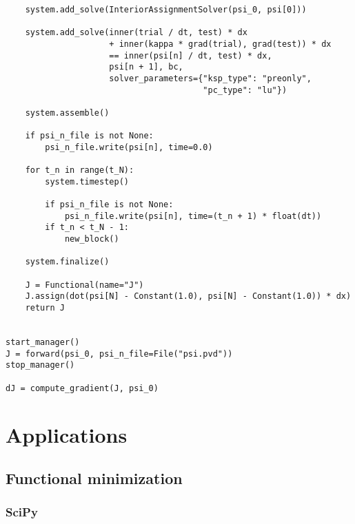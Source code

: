 \documentclass[11pt]{article}
\begin{document}
\begin{lstlisting}
    system.add_solve(InteriorAssignmentSolver(psi_0, psi[0]))

    system.add_solve(inner(trial / dt, test) * dx
                     + inner(kappa * grad(trial), grad(test)) * dx
                     == inner(psi[n] / dt, test) * dx,
                     psi[n + 1], bc,
                     solver_parameters={"ksp_type": "preonly",
                                        "pc_type": "lu"})

    system.assemble()

    if psi_n_file is not None:
        psi_n_file.write(psi[n], time=0.0)

    for t_n in range(t_N):
        system.timestep()

        if psi_n_file is not None:
            psi_n_file.write(psi[n], time=(t_n + 1) * float(dt))
        if t_n < t_N - 1:
            new_block()

    system.finalize()

    J = Functional(name="J")
    J.assign(dot(psi[N] - Constant(1.0), psi[N] - Constant(1.0)) * dx)
    return J


start_manager()
J = forward(psi_0, psi_n_file=File("psi.pvd"))
stop_manager()

dJ = compute_gradient(J, psi_0)
\end{lstlisting}

\section{Applications}

\subsection{Functional minimization}\label{sect:minimization}

\subsubsection{SciPy}
\end{document}
